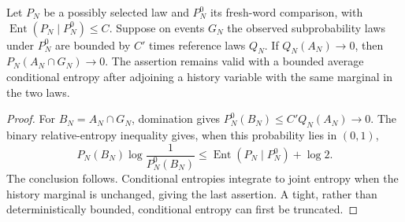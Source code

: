 \begin{lemma}
\label{loc:entropy-null}
Let $P_N$ be a possibly selected law and $P_N^0$ its fresh-word
comparison, with $\operatorname{Ent}(P_N\mid P_N^0)\le C$.
Suppose on events $G_N$ the observed subprobability laws under $P_N^0$
are bounded by $C'$ times reference laws $Q_N$.  If
$Q_N(A_N)\to0$, then
$P_N(A_N\cap G_N)\to0$.  The assertion remains valid with a bounded
average conditional entropy after adjoining a history variable with
the same marginal in the two laws.
\end{lemma}
\begin{proof}
For $B_N=A_N\cap G_N$, domination gives
$P_N^0(B_N)\le C'Q_N(A_N)\to0$.  The binary relative-entropy
inequality gives, when this probability lies in $(0,1)$,
\[
 P_N(B_N)\log\frac1{P_N^0(B_N)}
 \le \operatorname{Ent}(P_N\mid P_N^0)+\log2.
\]
The conclusion follows.  Conditional entropies integrate to joint
entropy when the history marginal is unchanged, giving the last
assertion.  A tight, rather than deterministically bounded, conditional
entropy can first be truncated.
\end{proof}

